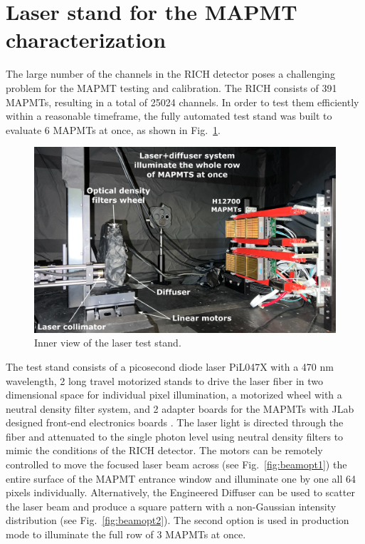 
\section{Laser stand for the MAPMT characterization}
The large number of the channels in the RICH detector  poses a challenging problem for the MAPMT testing and calibration.
The RICH consists of 391 MAPMTs, resulting in a total of 25024 channels. In order to test them efficiently within a reasonable timeframe, the fully automated test stand was built to evaluate 6 MAPMTs at once, as shown in Fig.~\ref{fig:MAPMTtest}.

\begin{figure}[hbt]
	\centering
	\includegraphics[width=0.9\linewidth]{figures/LaserSetup.png}
	\caption{Inner view of the laser test stand.}
	\label{fig:MAPMTtest}
\end{figure}

The test stand consists of a picosecond diode  laser PiL047X with a 470 nm wavelength, 2 long travel motorized stands to drive the laser fiber in two dimensional space for individual pixel illumination, a motorized wheel with a neutral density filter system, and 2 adapter boards for the MAPMTs with JLab designed front-end electronics boards \cite{Contalbrigo:2020}.
The laser light is directed through the fiber and attenuated to the single photon level using neutral density filters to mimic the conditions of the RICH detector.
The motors can be remotely controlled to move the focused laser beam across (see Fig.~\ref{fig:beamopt1}) the entire surface of the MAPMT entrance window and illuminate one by one all 64 pixels individually.
Alternatively, the Engineered Diffuser can be used to scatter the laser beam and produce a square pattern with a non-Gaussian intensity distribution (see Fig.~\ref{fig:beamopt2}). 
The second option is used in production mode to illuminate the full row of 3 MAPMTs at once.


